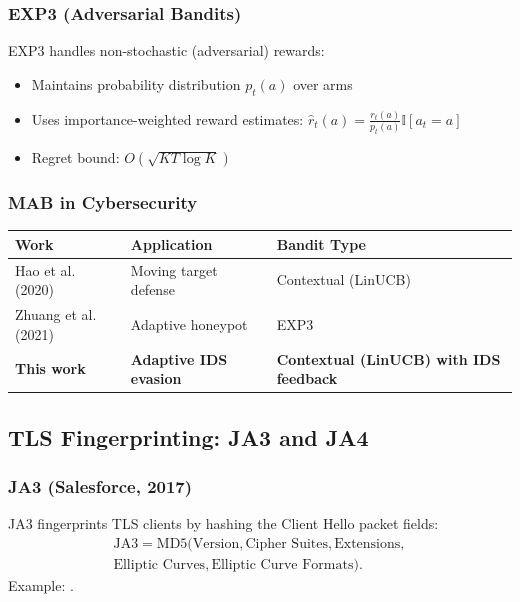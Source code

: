 \documentclass[review]{elsarticle}
\begin{document}
\subsubsection{EXP3 (Adversarial Bandits)}
EXP3 \cite{auer2002nonstochastic} handles non-stochastic (adversarial) rewards:
\begin{itemize}
\item Maintains probability distribution $p_t(a)$ over arms
\item Uses importance-weighted reward estimates: $\hat{r}_t(a) = \frac{r_t(a)}{p_t(a)} \mathbb{I}[a_t = a]$
\item Regret bound: $O(\sqrt{KT \log K})$
\end{itemize}

\subsubsection{MAB in Cybersecurity}
\begin{table}[htbp]
\small
\centering
\renewcommand{\arraystretch}{1.2}
\begin{tabular}{|p{3.4cm}|p{3.6cm}|p{4.0cm}|}
\hline
\textbf{Work} & \textbf{Application} & \textbf{Bandit Type} \\
\hline
Hao et al. (2020) \cite{hao2020moving} & Moving target defense & Contextual (LinUCB) \\
Zhuang et al. (2021) \cite{zhuang2021adaptive} & Adaptive honeypot & EXP3 \\
\textbf{This work} & \textbf{Adaptive IDS evasion} & \textbf{Contextual (LinUCB) with IDS feedback} \\
\hline
\end{tabular}
\end{table}

\subsection{TLS Fingerprinting: JA3 and JA4}
\subsubsection{JA3 (Salesforce, 2017)}
JA3 fingerprints TLS clients by hashing the Client Hello packet fields:
\[
\begin{gathered}
\text{JA3} = \text{MD5}\big(\text{Version}, \text{Cipher Suites}, \text{Extensions},\\
\text{Elliptic Curves}, \text{Elliptic Curve Formats}\big).
\end{gathered}
\]
Example: \texttt{\footnotesize{}}.
\end{document}
